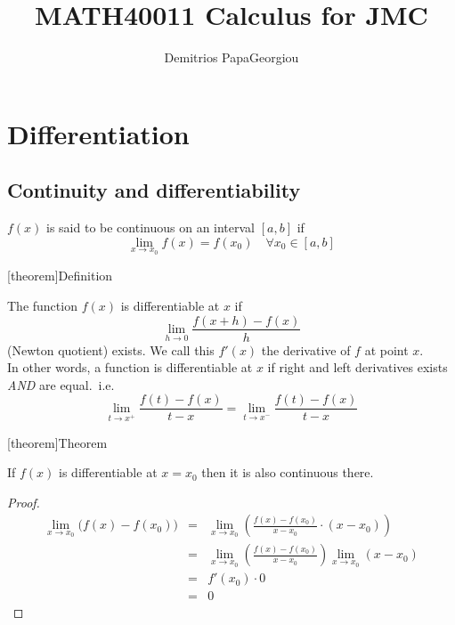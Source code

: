 \documentclass[12pt]{report}
\author{Demitrios PapaGeorgiou}
\title{MATH40011 Calculus for JMC}
\theoremstyle{definition}
\begin{document}
\maketitle
\tableofcontents

\chapter{Differentiation}

\section{Continuity and differentiability}

\begin{theorem}
    $f(x)$ is said to be continuous on an interval $[a,b]$ if \[
        \lim_{x \rightarrow x_0} f(x) = f(x_0) \quad \forall x_0 \in [a,b]
    \]
\end{theorem}

[theorem]{Definition}
\begin{differentiability}
    The function $f(x)$ is differentiable at $x$ if \[
        \lim_{h \rightarrow 0} \frac{f(x+h) - f(x)}{h}
    \] (Newton quotient) exists. We call this $f'(x)$ the derivative of $f$ at point $x$.
    \\In other words, a function is differentiable at $x$ 
    if right and left derivatives exists \emph{AND} are equal.\ i.e. \[
        \lim_{t \rightarrow x^{+}} \frac{f(t) - f(x)}{t - x} 
        = \lim_{t \rightarrow x^{-}} \frac{f(t) - f(x)}{t - x}
    \]
\end{differentiability}

[theorem]{Theorem}
\begin{differentiable means continuous}
    If $f(x)$ is differentiable at $x = x_0$ then it is also continuous there.
\end{differentiable means continuous}
\begin{proof}
    \begin{eqnarray*}
        \lim_{x \rightarrow x_0} \Big(f(x) - f(x_0)\big)
        &=& \lim_{x \rightarrow x_0} \left(\frac{f(x) - f(x_0)}{x - x_0} \cdot (x - x_0)\right) \\
        &=& \lim_{x \rightarrow x_0} \left(\frac{f(x) - f(x_0)}{x - x_0}\right) 
        \lim_{x \rightarrow x_0} (x - x_0) \\
        &=& f'(x_0) \cdot 0 \\
        &=& 0
    \end{eqnarray*}
\end{proof}
\end{document}

